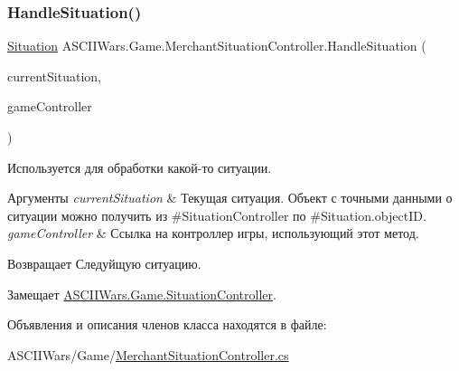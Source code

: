 \subsubsection{\texorpdfstring{Handle\+Situation()}{HandleSituation()}}
{\footnotesize\ttfamily \hyperlink{class_a_s_c_i_i_wars_1_1_game_1_1_situation}{Situation} A\+S\+C\+I\+I\+Wars.\+Game.\+Merchant\+Situation\+Controller.\+Handle\+Situation (\begin{DoxyParamCaption}\item[{\hyperlink{class_a_s_c_i_i_wars_1_1_game_1_1_situation}{Situation}}]{current\+Situation,  }\item[{\hyperlink{class_a_s_c_i_i_wars_1_1_game_1_1_game_controller}{Game\+Controller}}]{game\+Controller }\end{DoxyParamCaption})\hspace{0.3cm}{\ttfamily [inline]}}



Используется для обработки какой-\/то ситуации. 


\begin{DoxyParams}{Аргументы}
{\em current\+Situation} & Текущая ситуация. Объект с точными данными о ситуации можно получить из \#\+Situation\+Controller по \#\+Situation.\+object\+ID. \\
\hline
{\em game\+Controller} & Ссылка на контроллер игры, использующий этот метод. \\
\hline
\end{DoxyParams}
\begin{DoxyReturn}{Возвращает}
Следуйщую ситуацию. 
\end{DoxyReturn}


Замещает \hyperlink{interface_a_s_c_i_i_wars_1_1_game_1_1_situation_controller_a2cf0359dfc1683beb63f0dfed1c372e6}{A\+S\+C\+I\+I\+Wars.\+Game.\+Situation\+Controller}.



Объявления и описания членов класса находятся в файле\+:\begin{DoxyCompactItemize}
\item 
A\+S\+C\+I\+I\+Wars/\+Game/\hyperlink{_merchant_situation_controller_8cs}{Merchant\+Situation\+Controller.\+cs}\end{DoxyCompactItemize}
